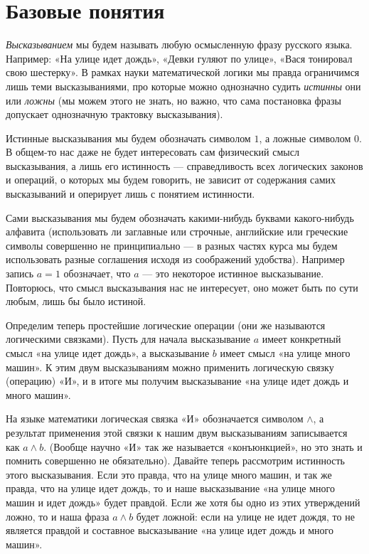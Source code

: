 \section{Базовые понятия}

{\slshape Высказыванием} мы будем называть любую осмысленную фразу русского языка. Например: «На улице идет дождь», «Девки гуляют по улице», «Вася тонировал свою шестерку». В рамках науки математической логики мы правда ограничимся лишь теми высказываниями, про которые можно однозначно судить {\slshape истинны} они или {\slshape ложны} (мы можем этого не знать, но важно, что сама постановка фразы допускает однозначную трактовку высказывания{\slshape }).

Истинные высказывания мы будем обозначать символом $1$, а ложные символом $0$. В общем-то нас даже не будет интересовать сам физический смысл высказывания, а лишь его истинность — справедливость всех логических законов и операций, о которых мы будем говорить, не зависит от содержания самих высказываний и оперирует лишь с понятием истинности.

Сами высказывания мы будем обозначать какими-нибудь буквами какого-нибудь алфавита (использовать ли заглавные или строчные, английские или греческие символы совершенно не принципиально — в разных частях курса мы будем использовать разные соглашения исходя из соображений удобства). Например запись $a = 1$ обозначает, что $a$ — это некоторое истинное высказывание. Повторюсь, что смысл высказывания нас не интересует, оно может быть по сути любым, лишь бы было истиной.

Определим теперь простейшие логические операции (они же называются логическими связками). Пусть для начала высказывание $a$ имеет конкретный смысл «на улице идет дождь», а высказывание $b$ имеет смысл «на улице много машин». К этим двум высказываниям можно применить логическую связку (операцию) «И», и в итоге мы получим высказывание «на улице идет дождь и много машин».

На языке математики логическая связка «И» обозначается символом $\wedge$, а результат применения этой связки к нашим двум высказываниям записывается как $a\wedge b$. (Вообще научно «И» так же называется «конъюнкцией», но это знать и помнить совершенно не обязательно). Давайте теперь рассмотрим истинность этого высказывания. Если это правда, что на улице много машин, и так же правда, что на улице идет дождь, то и наше высказывание «на улице много машин и идет дождь» будет правдой. Если же  хотя бы одно из этих утверждений ложно, то и наша фраза $a \wedge b$ будет ложной: если на улице не идет дождя, то не является правдой и составное высказывание «на улице идет дождь и много машин».


